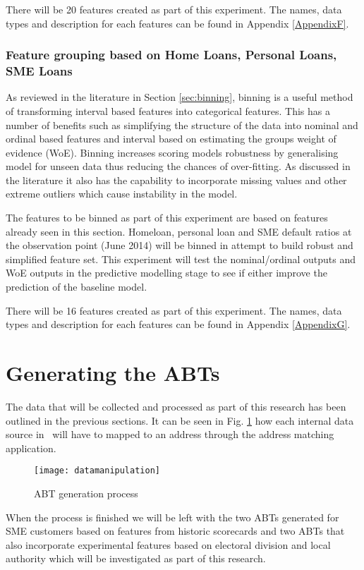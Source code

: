 There will be 20 features created as part of this experiment. The names, data types and description for each features can be found in Appendix \ref{AppendixF}.

\subsubsection{Feature grouping based on Home Loans, Personal Loans, SME Loans}
As reviewed in the literature in Section \ref{sec:binning}, binning is a useful method of transforming interval based features into categorical features. This has a number of benefits such as simplifying the structure of the data into nominal and ordinal based features and interval based on estimating the groups weight of evidence (WoE). Binning increases scoring models robustness by generalising model for unseen data thus reducing the chances of over-fitting. As discussed in the literature it also has the capability to incorporate missing values and other extreme outliers which cause instability in the model. 

The features to be binned as part of this experiment are based on features already seen in this section. Homeloan, personal loan and SME default ratios at the observation point (June 2014) will be binned in attempt to build robust and simplified feature set. This experiment will test the nominal/ordinal outputs and WoE outputs in the predictive modelling stage to see if either improve the prediction of the baseline model.

There will be 16 features created as part of this experiment. The names, data types and description for each features can be found in Appendix \ref{AppendixG}.


\section{Generating the ABTs}
The data that will be collected and processed as part of this research has been outlined in the previous sections. It can be seen in Fig. \ref{fig:datamanipulation} how each internal data source in \subjectname\ will have to mapped to an address through the address matching application. 

\begin{figure}[H]
	\texttt{[image: datamanipulation]}
	\caption{ABT generation process}
	\label{fig:datamanipulation}
\end{figure}

When the process is finished we will be left with the two ABTs generated for SME customers based on features from historic scorecards and two ABTs that also incorporate experimental features based on electoral division and local authority which will be investigated as part of this research.


